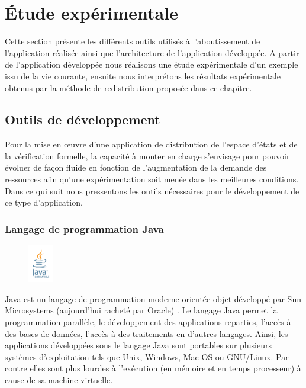 \section{Étude expérimentale}
Cette section présente les différents outils utilisés à l'aboutissement de l'application réalisée ainsi que l'architecture de l'application développée.
A partir de l'application développée nous réalisons une étude expérimentale d'un exemple issu de la vie courante, ensuite nous interprétons les résultats expérimentale obtenus par la méthode de redistribution proposée dans ce chapitre.

\subsection{Outils de développement}
Pour la mise en œuvre d’une application de distribution de l'espace d'états et de la vérification formelle, la capacité à monter en charge s’envisage pour pouvoir évoluer de façon fluide en fonction de l'augmentation de la demande des ressources afin qu'une expérimentation soit menée dans les meilleures conditions. Dans ce qui suit nous pressentons les outils nécessaires pour le développement de ce type d'application. \newpage

\subsubsection*{Langage de programmation Java}
\begin{figure}
	\vspace{-60pt}
	\begin{center}
		\includegraphics[width=0.1\textwidth]{img/java}
	\end{center} 
	\vspace{-20pt}
	\vspace{-10pt} 
\end{figure}
Java est un langage de programmation moderne orientée objet développé par Sun Microsystems (aujourd'hui racheté par Oracle) \citep{java}. Le langage Java permet la programmation parallèle, le développement des applications reparties, l'accès à des bases de données, l'accès à des traitements en d'autres langages. Ainsi, les applications développées sous le langage  Java sont portables sur plusieurs systèmes d’exploitation tels que Unix, Windows, Mac OS ou GNU/Linux. Par contre elles sont plus lourdes à l'exécution (en mémoire et en temps processeur) à cause de sa machine virtuelle.
